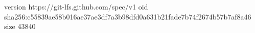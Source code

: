version https://git-lfs.github.com/spec/v1
oid sha256:c55839ae58b016ae37ae3df7a3b98dfd0a631b21fade7b74f2674b57b7af8a46
size 43840
